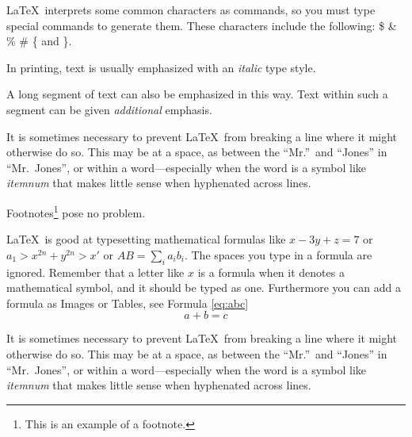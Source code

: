 \LaTeX\ interprets some common characters as
commands, so you must type special commands to
generate them.  These characters include the
following:
\$ \& \% \# \{ and \}.

In printing, text is usually emphasized with an
\emph{italic}  
type style.  

\begin{em}
    A long segment of text can also be emphasized 
    in this way.  Text within such a segment can be 
    given \emph{additional} emphasis.
\end{em}

It is sometimes necessary to prevent \LaTeX\ from
breaking a line where it might otherwise do so.
This may be at a space, as between the ``Mr.''\ and
``Jones'' in
``Mr.~Jones'',        %
or within a word---especially when the word is a
symbol like
\mbox{\emph{itemnum}} 
that makes little sense when hyphenated across
lines.

Footnotes\footnote{This is an example of a footnote.}
pose no problem.

\LaTeX\ is good at typesetting mathematical formulas
like
\( x-3y + z = 7 \) 
or
\( a_{1} > x^{2n} + y^{2n} > x' \)
or  
\( AB  = \sum_{i} a_{i} b_{i} \).
The spaces you type in a formula are 
ignored.  Remember that a letter like
$x$                   %
is a formula when it denotes a mathematical
symbol, and it should be typed as one.
Furthermore you can add a formula as Images or Tables, see Formula  \hyperref[eq:abc]{\ref{eq:abc}}
\begin{equation}
\label{eq:abc}
a+b=c
\end{equation}

    It is sometimes necessary to prevent \LaTeX\ from
breaking a line where it might otherwise do so.
This may be at a space, as between the ``Mr.''\ and
``Jones'' in
``Mr.~Jones'',        %
or within a word---especially when the word is a
symbol like
\mbox{\emph{itemnum}} 
that makes little sense when hyphenated across
lines.